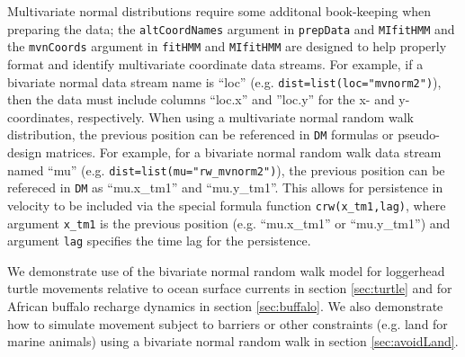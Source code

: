 \documentclass[12pt]{article}\usepackage[]{graphicx}\usepackage[]{color}
\begin{document}
Multivariate normal distributions require some additonal book-keeping when preparing the data; the \verb|altCoordNames| argument in \verb|prepData| and \verb|MIfitHMM| and the \verb|mvnCoords| argument in \verb|fitHMM| and \verb|MIfitHMM| are designed to help properly format and identify multivariate coordinate data streams. For example, if a bivariate normal data stream name is ``loc'' (e.g. \verb|dist=list(loc="mvnorm2")|), then the data must include columns ``loc.x'' and ''loc.y'' for the x- and y- coordinates, respectively. When using a multivariate normal random walk distribution, the previous position can be referenced in \verb|DM| formulas or pseudo-design matrices. For example, for a bivariate normal random walk data stream named ``mu'' (e.g. \verb|dist=list(mu="rw_mvnorm2")|), the previous position can be refereced in \verb|DM| as ``mu.x\_tm1'' and ``mu.y\_tm1''. This allows for persistence in velocity to be included via the special formula function \verb|crw(x_tm1,lag)|, where argument \verb|x_tm1| is the previous position (e.g. ``mu.x\_tm1'' or ``mu.y\_tm1'') and argument \verb|lag| specifies the time lag for the persistence.

We demonstrate use of the bivariate normal random walk model for loggerhead turtle movements relative to ocean surface currents in section \ref{sec:turtle} and for African buffalo recharge dynamics in section \ref{sec:buffalo}. We also demonstrate how to simulate movement subject to barriers or other constraints (e.g. land for marine animals) using a bivariate normal random walk in section \ref{sec:avoidLand}.
\end{document}
